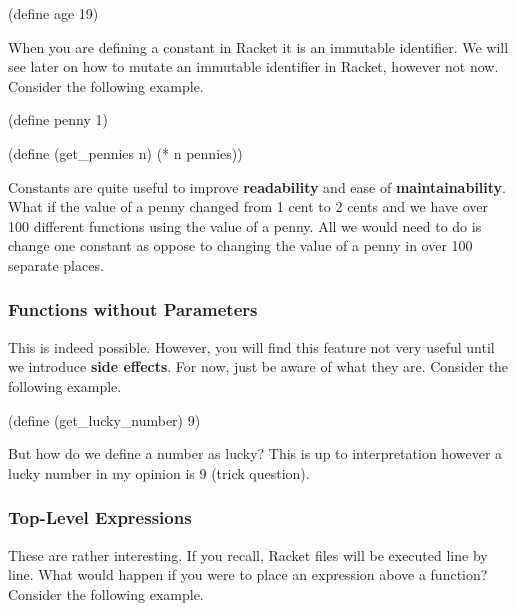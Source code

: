 \begin{code}[Lisp]
(define age 19)
\end{code}

When you are defining a constant in Racket it is an immutable identifier. We will see later on how to mutate an immutable identifier in Racket, however not now. Consider the following example.\\


\begin{code}[Lisp]
(define penny 1)

(define (get_pennies n)
	(* n pennies))
\end{code}

Constants are quite useful to improve \textbf{readability} and ease of \textbf{maintainability}. What if the value of a penny changed from 1 cent to 2 cents and we have over 100 different functions using the value of a penny. All we would need to do is change one constant as oppose to changing the value of a penny in over 100 separate places.

\subsubsection*{Functions without Parameters}

This is indeed possible. However, you will find this feature not very useful until we introduce \textbf{side effects}. For now, just be aware of what they are. Consider the following example.\\


\begin{code}[Lisp]
(define (get_lucky_number)
	9)
\end{code}

But how do we define a number as lucky? This is up to interpretation however a lucky number in my opinion is 9 (trick question).

\subsubsection*{Top-Level Expressions}

These are rather interesting. If you recall, Racket files will be executed line by line. What would happen if you were to place an expression above a function? Consider the following example.\\

